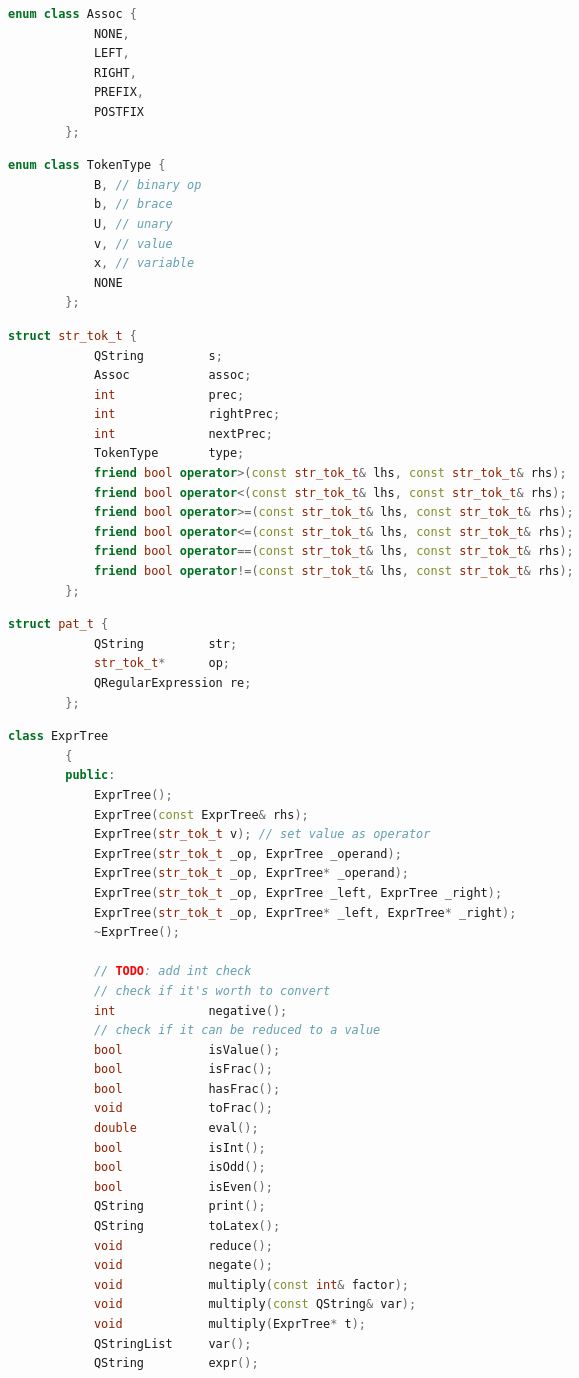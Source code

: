 \documentclass[12pt]{report}
\begin{document}
		\begin{spacing}{1}
		\begin{lstlisting}[language=C++, caption=Assoc enum, label=src:enum_assoc]
		enum class Assoc {
			NONE,
			LEFT,
			RIGHT,
			PREFIX,
			POSTFIX
		};
		\end{lstlisting}
		\begin{lstlisting}[language=C++, caption=TokenType enum, label=src:enum_tty]
		enum class TokenType {
			B, // binary op
			b, // brace
			U, // unary
			v, // value
			x, // variable
			NONE
		};
		\end{lstlisting}
		\begin{lstlisting}[language=C++, caption=Razred za hranjenje tokenov, label=src:str_tok_t]
		struct str_tok_t {
			QString         s;
			Assoc           assoc;
			int             prec;
			int             rightPrec;
			int             nextPrec;
			TokenType       type;
			friend bool operator>(const str_tok_t& lhs, const str_tok_t& rhs);
			friend bool operator<(const str_tok_t& lhs, const str_tok_t& rhs);
			friend bool operator>=(const str_tok_t& lhs, const str_tok_t& rhs);
			friend bool operator<=(const str_tok_t& lhs, const str_tok_t& rhs);
			friend bool operator==(const str_tok_t& lhs, const str_tok_t& rhs);
			friend bool operator!=(const str_tok_t& lhs, const str_tok_t& rhs);
		};
		\end{lstlisting}
		\begin{lstlisting}[language=C++, caption=Razred za hranjenje \textquote{regex} vzorea tokena, label=src:pat_t]
		struct pat_t {
			QString         str;
			str_tok_t*      op;
			QRegularExpression re;
		};
		\end{lstlisting}
		\begin{lstlisting}[language=C++, caption=Deklaracija AST, label=src:exprtree]
		class ExprTree
		{
		public:
			ExprTree();
			ExprTree(const ExprTree& rhs);
			ExprTree(str_tok_t v); // set value as operator
			ExprTree(str_tok_t _op, ExprTree _operand);
			ExprTree(str_tok_t _op, ExprTree* _operand);
			ExprTree(str_tok_t _op, ExprTree _left, ExprTree _right);
			ExprTree(str_tok_t _op, ExprTree* _left, ExprTree* _right);
			~ExprTree();
			
			// TODO: add int check
			// check if it's worth to convert
			int             negative();
			// check if it can be reduced to a value
			bool            isValue();
			bool            isFrac();
			bool            hasFrac();
			void            toFrac();
			double          eval();
			bool            isInt();
			bool            isOdd();
			bool            isEven();
			QString         print();
			QString         toLatex();
			void            reduce();
			void            negate();
			void            multiply(const int& factor);
			void            multiply(const QString& var);
			void            multiply(ExprTree* t);
			QStringList     var();
			QString         expr();
			

\end{lstlisting}
\end{spacing}
\end{document}
